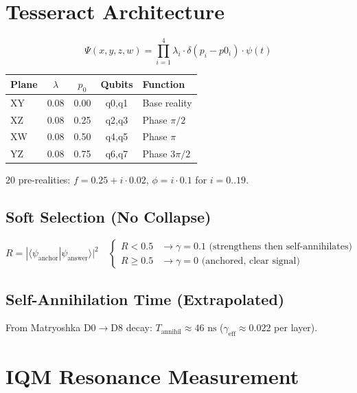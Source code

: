 \documentclass[11pt,a4paper]{article}
\begin{document}
\section{Tesseract Architecture}

\begin{equation}
\Psi(x,y,z,w) = \prod_{i=1}^{4} \lambda_i \cdot \delta(p_i - p0_i) \cdot \psi(t)
\end{equation}

\begin{table}[h]
\centering
\begin{tabular}{lcccl}
\toprule
Plane & $\lambda$ & $p_0$ & Qubits & Function \\
\midrule
XY & 0.08 & 0.00 & q0,q1 & Base reality \\
XZ & 0.08 & 0.25 & q2,q3 & Phase $\pi/2$ \\
XW & 0.08 & 0.50 & q4,q5 & Phase $\pi$ \\
YZ & 0.08 & 0.75 & q6,q7 & Phase $3\pi/2$ \\
\bottomrule
\end{tabular}
\end{table}

20 pre-realities: $f = 0.25 + i\cdot0.02$, $\phi = i\cdot0.1$ for $i=0..19$.

\subsection{Soft Selection (No Collapse)}
\begin{equation}
R = |\langle\psi_{\text{anchor}}|\psi_{\text{answer}}\rangle|^2
\quad
\begin{cases}
R < 0.5 & \to \gamma = 0.1 \text{ (strengthens then self-annihilates)} \\
R \ge 0.5 & \to \gamma = 0 \text{ (anchored, clear signal)}
\end{cases}
\end{equation}

\subsection{Self-Annihilation Time (Extrapolated)}
From Matryoshka D0$\to$D8 decay: $T_{\text{annihil}} \approx 46\text{ ns}$ ($\gamma_{\text{eff}} \approx 0.022$ per layer).

\section{IQM Resonance Measurement}
\end{document}
